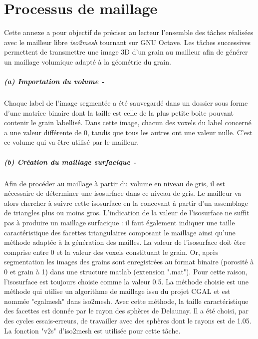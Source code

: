 \chapter{Processus de maillage}
\label{annexe:maillage}

Cette annexe a pour objectif de préciser au lecteur l'ensemble des tâches réalisées avec le mailleur libre \textit{iso2mesh} tournant sur GNU Octave. Les tâches successives permettent de transmettre une image 3D d'un grain au mailleur afin de générer un maillage volumique adapté à la géométrie du grain.

\paragraph{(a) Importation du volume -}
Chaque label de l'image segmentée a été sauvegardé dans un dossier sous forme d'une matrice binaire dont la taille est celle de la plus petite boite pouvant contenir le grain labellisé. Dans cette image, chacun des voxels du label concerné a une valeur différente de $0$, tandis que tous les autres ont une valeur nulle. C'est ce volume qui va être utilisé par le mailleur.
\paragraph{(b) Création du maillage surfacique -}
Afin de procéder au maillage à partir du volume en niveau de gris, il est nécessaire de déterminer une isosurface dans ce niveau de gris. Le mailleur va alors chercher à suivre cette isosurface en la concevant à partir d'un assemblage de triangles plus ou moins gros. L'indication de la valeur de l'isosurface ne suffit pas à produire un maillage surfacique : il faut également indiquer une taille caractéristique des facettes triangulaires composant le maillage ainsi qu'une méthode adaptée à la génération des mailles. La valeur de l'isosurface doit être comprise entre $0$ et la valeur des voxels constituant le grain. Or, après segmentation les images des grains sont enregistrées au format binaire (porosité à \num{0} et grain à \num{1}) dans une structure matlab (extension ".mat"). Pour cette raison, l'isosurface est toujours choisie comme la valeur \num{0.5}. La méthode choisie est une méthode qui utilise un algorithme de maillage issu du projet CGAL \citep{cgal:eb-19a} et est nommée "cgalmesh" dans iso2mesh. Avec cette méthode, la taille caractéristique des facettes est donnée par le rayon des sphères de Delaunay. Il a été choisi, par des cycles essais-erreurs, de travailler avec des sphères dont le rayons est de \SI{1.05}{\voxel}. La fonction "v2s" d'iso2mesh est utilisée pour cette tâche.
